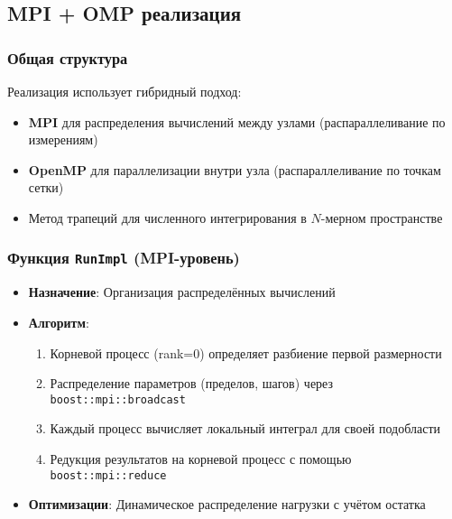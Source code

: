\documentclass[12pt]{article}
\begin{document}
\subsection{MPI + OMP реализация}
\subsubsection*{Общая структура}
Реализация использует гибридный подход:
\begin{itemize}
  \item \textbf{MPI} для распределения вычислений между узлами (распараллеливание по измерениям)
  \item \textbf{OpenMP} для параллелизации внутри узла (распараллеливание по точкам сетки)
  \item Метод трапеций для численного интегрирования в $N$-мерном пространстве
\end{itemize}

\subsubsection*{Функция \texttt{RunImpl} (MPI-уровень)}
\begin{itemize}
  \item \textbf{Назначение}: Организация распределённых вычислений
  \item \textbf{Алгоритм}:
  \begin{enumerate}
    \item Корневой процесс (rank=0) определяет разбиение первой размерности
    \item Распределение параметров (пределов, шагов) через \texttt{boost::mpi::broadcast}
    \item Каждый процесс вычисляет локальный интеграл для своей подобласти
    \item Редукция результатов на корневой процесс с помощью \texttt{boost::mpi::reduce}
  \end{enumerate}
  \item \textbf{Оптимизации}: Динамическое распределение нагрузки с учётом остатка
\end{itemize}
\end{document}
